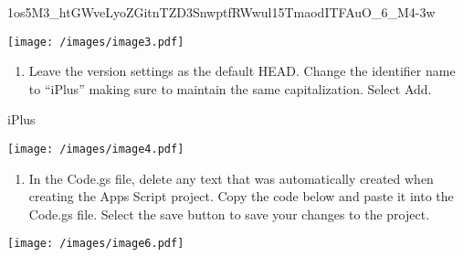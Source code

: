 \documentclass[
  letterpaper,
  DIV=11,
  numbers=noendperiod]{scrartcl}
\newenvironment{Shaded}{\begin{snugshade}}{\end{snugshade}}
\newcommand{\DecValTok}[1]{\textcolor[rgb]{0.68,0.00,0.00}{#1}}
\newcommand{\NormalTok}[1]{\textcolor[rgb]{0.00,0.23,0.31}{#1}}
\providecommand{\tightlist}{%
  \setlength{\itemsep}{0pt}\setlength{\parskip}{0pt}}\usepackage{longtable,booktabs,array}
\begin{document}
\begin{Shaded}
\begin{Highlighting}[]
\DecValTok{1}\NormalTok{os5M3\_htGWveLyoZGitnTZD3SnwptfRWwul15TmaodITFAuO\_6\_M4}\DecValTok{{-}3}\NormalTok{w}
\end{Highlighting}
\end{Shaded}

\texttt{[image: /images/image3.pdf]}

\begin{enumerate}
\def\labelenumi{\arabic{enumi}.}
\setcounter{enumi}{3}
\tightlist
\item
  Leave the version settings as the default HEAD. Change the identifier
  name to ``iPlus'' making sure to maintain the same capitalization.
  Select Add.
\end{enumerate}

\begin{Shaded}
\begin{Highlighting}[]
\NormalTok{iPlus}
\end{Highlighting}
\end{Shaded}

\texttt{[image: /images/image4.pdf]}

\begin{enumerate}
\def\labelenumi{\arabic{enumi}.}
\setcounter{enumi}{4}
\tightlist
\item
  In the Code.gs file, delete any text that was automatically created
  when creating the Apps Script project. Copy the code below and paste
  it into the Code.gs file. Select the save button to save your changes
  to the project.
\end{enumerate}

\texttt{[image: /images/image6.pdf]}
\end{document}
